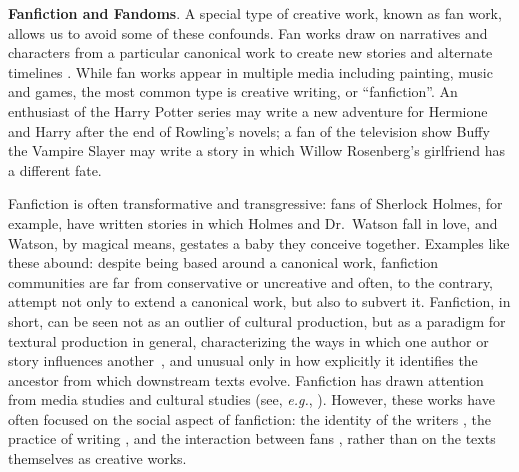 \documentclass[letterpaper]{article} %
\begin{document}
\textbf{Fanfiction and Fandoms}. A special type of creative work, known as fan work, allows us to avoid some of these confounds. Fan works draw on narratives and characters from a particular canonical work to create new stories and alternate timelines \cite{wiki:transf_work}. While fan works appear in multiple media including painting, music and games, the most common type is creative writing, or ``fanfiction''. An enthusiast of the Harry Potter series may write a new adventure for Hermione and Harry after the end of Rowling's novels; a fan of the television show Buffy the Vampire Slayer may write a story in which Willow Rosenberg's girlfriend has a different fate. 

Fanfiction is often transformative and transgressive: fans of Sherlock Holmes, for example, have written stories in which Holmes and Dr.\ Watson fall in love, and Watson, by magical means, gestates a baby they conceive together. Examples like these abound: despite being based around a canonical work, fanfiction communities are far from conservative or uncreative and often, to the contrary, attempt not only to extend a canonical work, but also to subvert it. Fanfiction, in short, can be seen not as an outlier of cultural production, but as a paradigm for textural production in general, characterizing the ways in which one author or story influences another~\cite{rohrs6north}, and  unusual only in how explicitly it identifies the ancestor from which downstream texts evolve. Fanfiction has drawn attention from media studies and cultural studies (see, \emph{e.g.}, \cite{thomas2011fanfiction}). However, these works have often focused on the social aspect of fanfiction: the identity of the writers \cite{black2006language}, the practice of writing \cite{LIT:LIT12061}, and the interaction between fans \cite{hills2015expertise}, rather than on the texts themselves as creative works.
\end{document}
